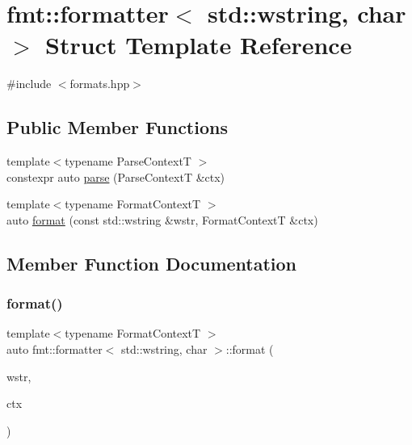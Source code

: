 \hypertarget{structfmt_1_1formatter_3_01std_1_1wstring_00_01char_01_4}{}\section{fmt\+:\+:formatter$<$ std\+:\+:wstring, char $>$ Struct Template Reference}
\label{structfmt_1_1formatter_3_01std_1_1wstring_00_01char_01_4}


{\ttfamily \#include $<$formats.\+hpp$>$}

\subsection*{Public Member Functions}
\begin{DoxyCompactItemize}
\item 
{\footnotesize template$<$typename Parse\+ContextT $>$ }\\constexpr auto \mbox{\hyperlink{structfmt_1_1formatter_3_01std_1_1wstring_00_01char_01_4_ad78cf9751e4e2502e12bfd6dd9ff2de5}{parse}} (Parse\+ContextT \&ctx)
\item 
{\footnotesize template$<$typename Format\+ContextT $>$ }\\auto \mbox{\hyperlink{structfmt_1_1formatter_3_01std_1_1wstring_00_01char_01_4_ab5e14bd7ab7e61a4d8bca4d6b74ffb76}{format}} (const std\+::wstring \&wstr, Format\+ContextT \&ctx)
\end{DoxyCompactItemize}


\subsection{Member Function Documentation}
\mbox{\label{structfmt_1_1formatter_3_01std_1_1wstring_00_01char_01_4_ab5e14bd7ab7e61a4d8bca4d6b74ffb76}} 
\subsubsection{\texorpdfstring{format()}{format()}}
{\footnotesize\ttfamily template$<$typename Format\+ContextT $>$ \\
auto fmt\+::formatter$<$ std\+::wstring, char $>$\+::format (\begin{DoxyParamCaption}\item[{const std\+::wstring \&}]{wstr,  }\item[{Format\+ContextT \&}]{ctx }\end{DoxyParamCaption})}


